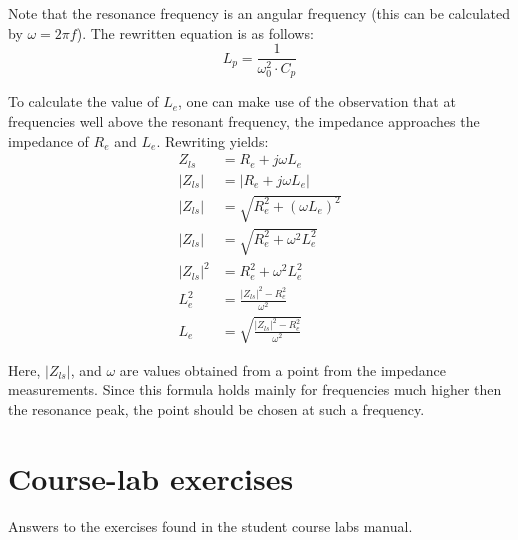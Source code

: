 \documentclass{article}
\newcommand\abs[1]{\left|#1\right|}
\begin{document}
Note that the resonance frequency is an angular frequency (this can be calculated by $\omega = 2\pi f$). The rewritten equation is as follows:
\begin{equation}
  L_p = \frac{1}{\omega_0^2 \cdot C_p}\label{eq:lp}
\end{equation}

To calculate the value of $L_e$, one can make use of the observation that at frequencies well above the resonant frequency, the impedance approaches the impedance of $R_e$ and $L_e$. Rewriting yields:
\begin{align}
  Z_{ls}         &= R_e + j \omega L_e\nonumber\\
  \abs{Z_{ls}}   &= \abs{R_e + j \omega L_e}\nonumber\\
  \abs{Z_{ls}}   &= \sqrt{R_e^2 + (\omega L_e)^2}\nonumber\\
  \abs{Z_{ls}}   &= \sqrt{R_e^2 + \omega^2 L_e^2}\nonumber\\
  \abs{Z_{ls}}^2 &= R_e^2 + \omega^2 L_e^2\nonumber\\
  L_e^2          &= \frac{\abs{Z_{ls}}^2 - R_e^2}{\omega^2}\nonumber\\
  L_e            &= \sqrt{\frac{\abs{Z_{ls}}^2 - R_e^2}{\omega^2}}\label{eq:le}
\end{align}

Here, $\abs{Z_{ls}}$, and $\omega$ are values obtained from a point from the impedance measurements. Since this formula holds mainly for frequencies much higher then the resonance peak, the point should be chosen at such a frequency.

\newpage\section{Course-lab exercises}
Answers to the exercises found in the student course labs manual. \cite{studentmanual}
\end{document}
